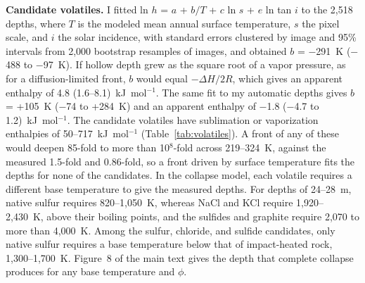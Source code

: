 \documentclass{planetary}
\begin{document}
\textbf{Candidate volatiles.} I fitted ln $h$ = $a$ + $b/T$ + $c$ ln $s$ + $e$ ln tan $i$ to the 2,518 depths, where $T$ is the modeled mean annual surface temperature, $s$ the pixel scale, and $i$ the solar incidence, with standard errors clustered by image and 95\% intervals from 2,000 bootstrap resamples of images, and obtained $b$ = $-$291~K ($-$488 to $-$97~K). If hollow depth grew as the square root of a vapor pressure, as for a diffusion-limited front, $b$ would equal $-\Delta H/2R$, which gives an apparent enthalpy of 4.8 (1.6--8.1)~kJ~mol$^{-1}$. The same fit to my automatic depths gives $b$ = +105~K ($-$74 to +284~K) and an apparent enthalpy of $-$1.8 ($-$4.7 to 1.2)~kJ~mol$^{-1}$. The candidate volatiles have sublimation or vaporization enthalpies of 50--717~kJ~mol$^{-1}$ (Table~\ref{tab:volatiles}). A front of any of these would deepen 85-fold to more than 10$^{8}$-fold across 219--324~K, against the measured 1.5-fold and 0.86-fold, so a front driven by surface temperature fits the depths for none of the candidates. In the collapse model, each volatile requires a different base temperature to give the measured depths. For depths of 24--28~m, native sulfur requires 820--1,050~K, whereas NaCl and KCl require 1,920--2,430~K, above their boiling points, and the sulfides and graphite require 2,070 to more than 4,000~K. Among the sulfur, chloride, and sulfide candidates, only native sulfur requires a base temperature below that of impact-heated rock, 1,300--1,700~K. Figure~8 of the main text gives the depth that complete collapse produces for any base temperature and $\phi$.
\end{document}
